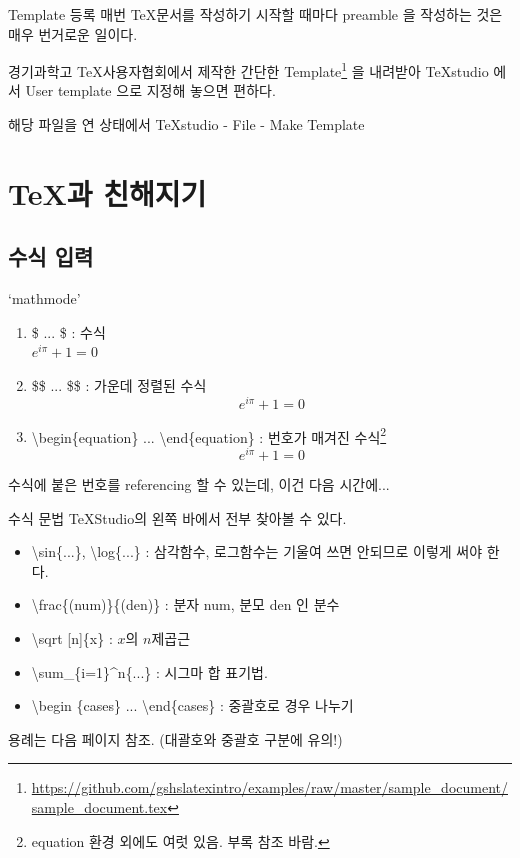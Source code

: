 \documentclass[12pt]{beamer}
\begin{document}
\begin{frame}{Template 등록}
	매번 \TeX 문서를 작성하기 시작할 때마다 preamble 을 작성하는 것은 매우 번거로운 일이다. 
	
	경기과학고 \TeX 사용자협회에서 제작한 간단한 Template\footnote{\url{https://github.com/gshslatexintro/examples/raw/master/sample_document/sample_document.tex}} 을 내려받아 TeXstudio 에서 User template 으로 지정해 놓으면 편하다.
	\vspace{0.7cm}
	
	해당 파일을 연 상태에서 TeXstudio - File - Make Template
\end{frame}
\section{\TeX 과 친해지기}
\subsection{수식 입력}
\begin{frame}{`mathmode'}
	\begin{enumerate}
		\item \$ ... \$ : 수식 \\
		$e^{i\pi}+1=0$
		\item \$\$ ... \$\$ : 가운데 정렬된 수식
		$$e^{i\pi}+1=0$$
		\item \textbackslash begin\{equation\} ... \textbackslash end\{equation\} : 번호가 매겨진 수식\footnote{equation 환경 외에도 여럿 있음. 부록 참조 바람.}
		\begin{equation}
		e^{i\pi}+1=0
		\end{equation}
	\end{enumerate}
	수식에 붙은 번호를 referencing 할 수 있는데, 이건 다음 시간에...
\end{frame}
\begin{frame}{수식 문법}
	TeXStudio의 왼쪽 바에서 전부 찾아볼 수 있다.
	\begin{itemize}
		\item \textbackslash sin\{...\}, \textbackslash log\{...\} : 삼각함수, 로그함수는 기울여 쓰면 안되므로 이렇게 써야 한다.
		\item \textbackslash frac\{(num)\}\{(den)\} : 분자 num, 분모 den 인 분수
		\item \textbackslash sqrt [n]\{x\} : $x$의 $n$제곱근
		\item \textbackslash sum\_\{i=1\}\textasciicircum{n}\{...\} : 시그마 합 표기법.
		\item \textbackslash begin \{cases\} ... \textbackslash end\{cases\} : 중괄호로 경우 나누기
	\end{itemize}
	용례는 다음 페이지 참조. {\footnotesize (대괄호와 중괄호 구분에 유의!)}
\end{frame}
\end{document}
